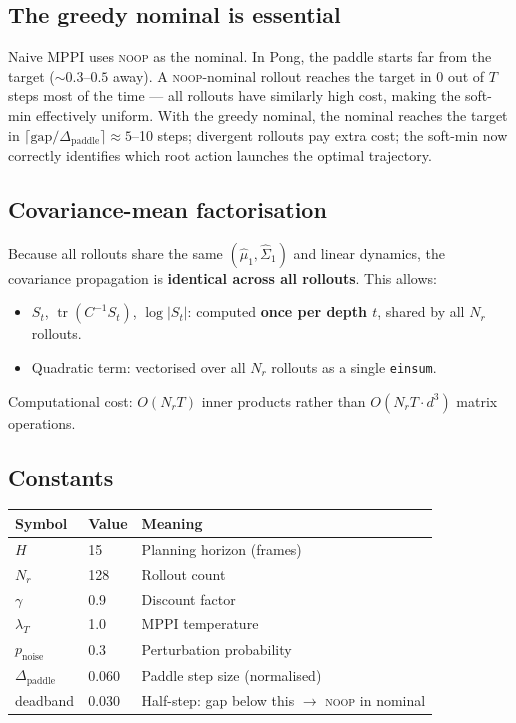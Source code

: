 \documentclass[12pt, a4paper]{article}
\newcommand{\1}{\mathbf{1}}
\newcommand{\tr}{\operatorname{tr}}
\newcommand{\code}[1]{\texttt{#1}}
\begin{document}
\subsection{The greedy nominal is essential}

Naive MPPI uses \textsc{noop} as the nominal.  In Pong, the paddle starts far
from the target ($\sim 0.3$--$0.5$ away).  A \textsc{noop}-nominal rollout
reaches the target in 0 out of $T$ steps most of the time --- all rollouts have
similarly high cost, making the soft-min effectively uniform.  With the greedy
nominal, the nominal reaches the target in
$\lceil\text{gap}/\Delta_\text{paddle}\rceil \approx 5$--10 steps; divergent
rollouts pay extra cost; the soft-min now correctly identifies which root action
launches the optimal trajectory.

\subsection{Covariance-mean factorisation}

Because all rollouts share the same $(\hat\mu_1, \hat\Sigma_1)$ and linear
dynamics, the covariance propagation is \textbf{identical across all rollouts}.
This allows:
\begin{itemize}
  \item $S_t$, $\tr(C^{-1}S_t)$, $\log|S_t|$: computed \textbf{once per depth
    $t$}, shared by all $N_r$ rollouts.
  \item Quadratic term: vectorised over all $N_r$ rollouts as a single
    \code{einsum}.
\end{itemize}
Computational cost: $O(N_r T)$ inner products rather than
$O(N_r T \cdot d^3)$ matrix operations.

\subsection{Constants}

\begin{table}[ht]
\centering
\begin{tabular}{lll}
\toprule
Symbol & Value & Meaning \\
\midrule
$H$                  & 15    & Planning horizon (frames) \\
$N_r$                & 128   & Rollout count \\
$\gamma$             & 0.9   & Discount factor \\
$\lambda_T$          & 1.0   & MPPI temperature \\
$p_\text{noise}$     & 0.3   & Perturbation probability \\
$\Delta_\text{paddle}$ & 0.060 & Paddle step size (normalised) \\
deadband             & 0.030 & Half-step: gap below this $\to$ \textsc{noop} in nominal \\
\bottomrule
\end{tabular}
\end{table}
\end{document}
